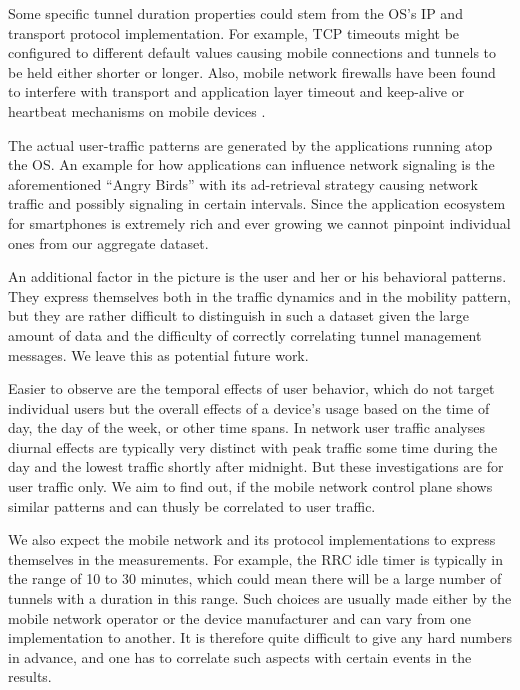 Some specific tunnel duration properties could stem from the \gls{OS}'s IP and transport protocol implementation. For example, TCP timeouts might be configured to different default values causing mobile connections and tunnels to be held either shorter or longer. Also, mobile network firewalls have been found to interfere with transport and application layer timeout and keep-alive or heartbeat mechanisms on mobile devices \cite{sigcomm11middleboxes}.

The actual user-traffic patterns are generated by the applications running atop the OS. An example for how applications can influence network signaling is the aforementioned ``Angry Birds'' with its ad-retrieval strategy causing network traffic and possibly signaling in certain intervals. Since the application ecosystem for smartphones is extremely rich and ever growing we cannot pinpoint individual ones from our aggregate dataset.

An additional factor in the picture is the user and her or his behavioral patterns. They express themselves both in the traffic dynamics and in the mobility pattern, but they are rather difficult to distinguish in such a dataset given the large amount of data and the difficulty of correctly correlating tunnel management messages. We leave this as potential future work.

Easier to observe are the temporal effects of user behavior, which do not target individual users but the overall effects of a device's usage based on the time of day, the day of the week, or other time spans. In network user traffic analyses diurnal effects are typically very distinct with peak traffic some time during the day and the lowest traffic shortly after midnight. But these investigations are for user traffic only. We aim to find out, if the mobile network control plane shows similar patterns and can thusly be correlated to user traffic.

We also expect the mobile network and its protocol implementations to express themselves in the measurements. For example, the \gls{RRC} idle timer is typically in the range of 10 to 30 minutes, which could mean there will be a large number of tunnels with a duration in this range. Such choices are usually made either by the mobile network operator or the device manufacturer and can vary from one implementation to another. It is therefore quite difficult to give any hard numbers in advance, and one has to correlate such aspects with certain events in the results.




